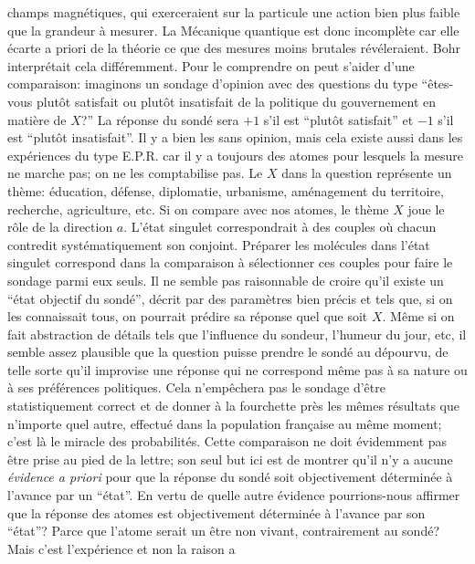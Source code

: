 champs magn\'etiques, qui exerceraient sur la particule une action bien 
plus faible que la grandeur \`a mesurer. La M\'ecanique quantique est 
donc incompl\`ete car elle \'ecarte a priori de la th\'eorie  ce que des 
mesures moins brutales r\'ev\'eleraient.    
\medskip  
Bohr interpr\'etait cela diff\'eremment. Pour le comprendre on peut 
s'aider d'une comparaison: imaginons un sondage d'opinion avec des
questions du type ``\^etes-vous plut\^ot satisfait ou plut\^ot insatisfait
de la politique du gouvernement en mati\`ere de $X$?'' La r\'eponse du
sond\'e sera $+1$ s'il est ``plut\^ot satisfait'' et $-1$ s'il est ``plut\^ot
insatisfait''. Il y a bien les  sans opinion, mais cela existe aussi dans les
exp\'eriences du type E.P.R. car il y a toujours des atomes pour lesquels 
la mesure ne marche pas; on ne les comptabilise pas. Le $X$ dans la
question repr\'esente un th\`eme: \'education, d\'efense, diplomatie,
urbanisme, am\'enagement du territoire, recherche, agriculture, etc. Si 
on compare avec nos atomes, le th\`eme  $X$ joue le r\^ole de la direction
$a$. L'\'etat singulet correspondrait \`a  des couples o\`u chacun contredit
syst\'ematiquement son conjoint. Pr\'eparer les mol\'ecules dans l'\'etat
singulet correspond dans la comparaison \`a  s\'electionner ces couples
pour faire le sondage parmi eux seuls. Il ne semble  pas raisonnable de
croire qu'il existe  un ``\'etat objectif du sond\'e'', d\'ecrit par des
param\`etres bien pr\'ecis et tels que, si on les connaissait tous, on
pourrait pr\'edire sa r\'eponse quel que soit $X$. M\^eme si on fait
abstraction de d\'etails tels que l'influence du sondeur, l'humeur du jour,
etc, il semble assez plausible  que la question puisse prendre le sond\'e
au d\'epourvu, de telle sorte  qu'il improvise une r\'eponse qui  ne
correspond m\^eme pas \`a sa nature ou \`a ses pr\'ef\'erences politiques.
Cela n'emp\^echera pas le sondage d'\^etre statistiquement correct et de 
donner \`a la fourchette pr\`es   les m\^emes r\'esultats que n'importe
quel autre, effectu\'e dans la population fran\c{c}aise au m\^eme moment;
c'est l\`a le miracle des probabilit\'es. Cette comparaison ne doit
\'evidemment pas \^etre prise  au pied de la  lettre; son seul but ici est  
de montrer qu'il n'y a aucune {\it \'evidence a priori} pour que la r\'eponse
du sond\'e soit objectivement d\'etermin\'ee \`a l'avance par un ``\'etat''.
En vertu de quelle autre \'evidence pourrions-nous affirmer que la
r\'eponse des atomes  est objectivement  d\'etermin\'ee \`a l'avance par
son ``\'etat''? Parce que l'atome serait un  \^etre non vivant,
contrairement au sond\'e? Mais c'est l'exp\'erience et non  la raison a
